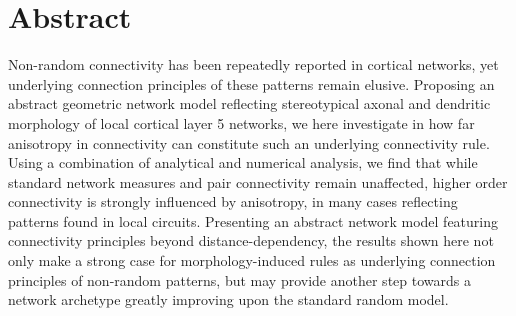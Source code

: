 \begingroup
\let\clearpage\relax
\let\cleardoublepage\relax
\let\cleardoublepage\relax

\chapter*{Abstract}

Non-random connectivity has been repeatedly reported in cortical
networks, yet underlying connection principles of these patterns
remain elusive. Proposing an abstract geometric network model
reflecting stereotypical axonal and dendritic morphology of local
cortical layer 5 networks, we here investigate in how far anisotropy
in connectivity can constitute such an underlying connectivity
rule. Using a combination of analytical and numerical analysis, we
find that while standard network measures and pair connectivity remain
unaffected, higher order connectivity is strongly influenced by
anisotropy, in many cases reflecting patterns found in local
circuits. Presenting an abstract network model featuring connectivity
principles beyond distance-dependency, the results shown here not only
make a strong case for morphology-induced rules as underlying
connection principles of non-random patterns, but may provide another
step towards a network archetype greatly improving upon the standard
random model.











\endgroup			

\vfill

